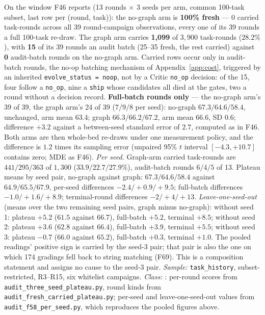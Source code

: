 \begin{description}[leftmargin=0pt,labelindent=0pt,labelsep=0pt,style=nextline,font=\normalfont,itemsep=6pt]
\item[\textbf{F58}\quad Fresh vs carried composition of the R3--R15
      plateau.]
On the window F46 reports (13 rounds $\times$ 3 seeds per arm, common
100-task subset, last row per (round, task)): the no-graph arm is
\textbf{100\% fresh} --- 0 carried task-rounds across all 39
round-campaign observations, every one of its 39 rounds a full 100-task
re-draw. The graph arm carries \textbf{1{,}099} of $3{,}900$ task-rounds
($28.2\%$), with \textbf{15} of its 39 rounds an audit batch (25--35
fresh, the rest carried) against \textbf{0} audit-batch rounds on the
no-graph arm. Carried rows occur only in audit-batch rounds, the no-op
batching mechanism of Appendix~\ref{app:cost}, triggered by an inherited
\texttt{evolve\_status = noop}, not by a Critic \texttt{no\_op} decision: of the 15, four follow a \texttt{no\_op},
nine a \texttt{ship} whose candidates all died at the gates, two a round
without a decision record. \textbf{Full-batch rounds
only} --- the no-graph arm's 39 of 39, the graph arm's 24 of 39 ($7/9/8$
per seed): no-graph $67.3 / 64.6 / 58.4$, unchanged, arm mean $63.4$;
graph $66.3 / 66.2 / 67.2$, arm mean $66.6$, SD $0.6$; difference $+3.2$
against a between-seed standard error of $2.7$, computed as in F46. Both
arms are then whole-bed re-draws under one measurement policy, and the
difference is $1.2$ times its sampling error (unpaired 95\% $t$ interval
$[-4.3, +10.7]$ contains zero; MDE as F46).
\emph{Per seed.} Graph-arm carried task-rounds are $441/295/363$ of
$1{,}300$ ($33.9/22.7/27.9\%$), audit-batch rounds $6/4/5$ of 13.
Plateau means by seed pair, no-graph against graph: $67.3/64.6/58.4$
against $64.9/65.5/67.9$, per-seed differences $-2.4/+0.9/+9.5$;
full-batch differences $-1.0/+1.6/+8.9$; terminal-round differences
$-2/+4/+13$.
\emph{Leave-one-seed-out} (means over the two remaining seed pairs, graph
minus no-graph): without seed 1: plateau $+5.2$ ($61.5$ against $66.7$), full-batch $+5.2$, terminal $+8.5$; without seed 2: plateau $+3.6$ ($62.8$ against $66.4$), full-batch $+3.9$, terminal $+5.5$; without seed 3: plateau $-0.7$ ($66.0$ against $65.2$), full-batch $+0.3$, terminal $+1.0$.
The pooled readings' positive sign is carried by the seed-3 pair; that pair
is also the one on which 174 gradings fell back to string matching (F69).
This is a composition statement and assigns no cause to the seed-3 pair.
\emph{Sample:} \texttt{task\_history}, subset-restricted, R3--R15, six
whitelist campaigns. \emph{Class:} : per-round scores from
\texttt{audit\_three\_seed\_plateau.py}, round kinds from
\texttt{audit\_fresh\_carried\_plateau.py}; per-seed and leave-one-seed-out
values from \texttt{audit\_f58\_per\_seed.py}, which reproduces the pooled
figures above.


\end{description}
